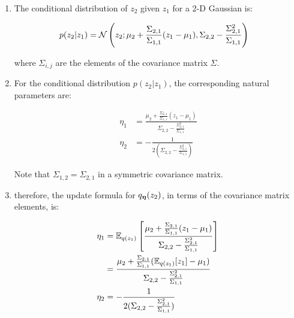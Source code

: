 \documentclass{article}
\begin{document}
\begin{enumerate}

\item
The conditional distribution of $z_2$ given $z_1$ for a 2-D Gaussian is:

\begin{equation}\begin{split}
p(z_2 | z_1) &= \mathcal{N}\left(z_2; \mu_2 + \frac{\Sigma_{2,1}}{\Sigma_{1,1}}(z_1 - \mu_1), \Sigma_{2,2} - \frac{\Sigma_{2,1}^2}{\Sigma_{1,1}}\right)
\end{split}\end{equation}

where $\Sigma_{i,j}$ are the elements of the covariance matrix $\Sigma$.





\item

For the conditional distribution $p(z_2|z_1)$, the corresponding natural parameters are:

\begin{equation}\begin{split}
\eta_1 &= \frac{\mu_2 + \frac{\Sigma_{2,1}}{\Sigma_{1,1}}(z_1 - \mu_1)}{\Sigma_{2,2} - \frac{\Sigma_{2,1}^2}{\Sigma_{1,1}}} \\
\eta_2 &= -\frac{1}{2(\Sigma_{2,2} - \frac{\Sigma_{2,1}^2}{\Sigma_{1,1}})}
\end{split}\end{equation}

Note that $\Sigma_{1,2} = \Sigma_{2,1}$ in a symmetric covariance matrix. 

\item
therefore, the update formula for $q_{\boldsymbol{\eta}}(z_2)$, in terms of the covariance matrix elements, is:


\begin{equation}\begin{split}
\eta_1 &= \mathbb{E}_{q(z_1)} \left[ \frac{\mu_2 + \frac{\Sigma_{2,1}}{\Sigma_{1,1}}(z_1 - \mu_1)}{\Sigma_{2,2} - \frac{\Sigma_{2,1}^2}{\Sigma_{1,1}}} \right] \\
&= \frac{\mu_2 + \frac{\Sigma_{2,1}}{\Sigma_{1,1}}(\mathbb{E}_{q(z_1)}[z_1] - \mu_1)}{\Sigma_{2,2} - \frac{\Sigma_{2,1}^2}{\Sigma_{1,1}}} \\
\eta_2 &= -\frac{1}{2(\Sigma_{2,2} - \frac{\Sigma_{2,1}^2}{\Sigma_{1,1}})}
\end{split}\end{equation}


\end{enumerate}
\end{document}
